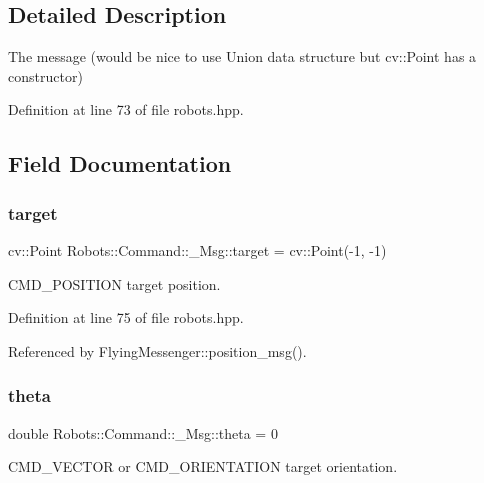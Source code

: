 \subsection{Detailed Description}
The message (would be nice to use Union data structure but cv\+::\+Point has a constructor) 

Definition at line 73 of file robots.\+hpp.



\subsection{Field Documentation}
\mbox{\label{struct_robots_1_1_command_1_1___msg_a86e7180d8d9c511620c703377870775e}} 
\subsubsection{\texorpdfstring{target}{target}}
{\footnotesize\ttfamily cv\+::\+Point Robots\+::\+Command\+::\+\_\+\+Msg\+::target = cv\+::\+Point(-\/1, -\/1)}



C\+M\+D\+\_\+\+P\+O\+S\+I\+T\+I\+ON target position. 



Definition at line 75 of file robots.\+hpp.



Referenced by Flying\+Messenger\+::position\+\_\+msg().

\mbox{\label{struct_robots_1_1_command_1_1___msg_a21599dd0707b283bf1ba1f25544bfb1d}} 
\subsubsection{\texorpdfstring{theta}{theta}}
{\footnotesize\ttfamily double Robots\+::\+Command\+::\+\_\+\+Msg\+::theta = 0}



C\+M\+D\+\_\+\+V\+E\+C\+T\+OR or C\+M\+D\+\_\+\+O\+R\+I\+E\+N\+T\+A\+T\+I\+ON target orientation. 



